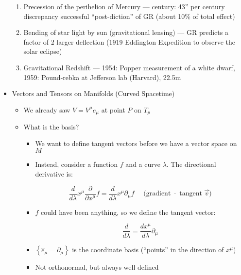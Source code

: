 \begin{itemize}
\begin{enumerate}
      \item Precession of the perihelion of Mercury —  century: 43'' per century discrepancy successful ``post-diction'' of GR (about 10\% of total effect)

      \item Bending of star light by sun (gravitational lensing) — GR predicts a factor of 2 larger deflection (1919 Eddington Expedition to observe the solar eclipse)

      \item Gravitational Redshift — 1954: Popper measurement of a white dwarf, 1959: Pound-rebka at Jefferson lab (Harvard), 22.5m

    \end{enumerate}

  \item Vectors and Tensors on Manifolds (Curved Spacetime)

    \begin{itemize}

      \item We already saw $V=V^{\mu}\hat{e}_{\mu}$ at point $P$ on $T_p$

      \item What is the basis?

        \begin{itemize}

          \item We want to define tangent vectors before we have a vector space on $M$

          \item Instead, consider a function $f$ and a curve $\lambda$. The directional derivative is:

            $$\frac{d}{d\lambda}x^{\mu}\frac{\partial}{\partial x^{\mu}}f=\frac{d}{d\lambda}x^{\mu}\partial_{\mu}f\quad\text{ (gradient $\cdot$ tangent $\vec{v}$)}$$

          \item $f$ could have been anything, so we define the tangent vector:

            $$\frac{d}{d\lambda}=\frac{dx^{\mu}}{d\lambda}\partial_{\mu}$$
            
          \item $\left\{ \hat{e}_{\mu}=\partial_{\mu} \right\}$ is the coordinate basis (``points'' in the direction of $x^{\mu}$)

          \item Not orthonormal, but always well defined


\end{itemize}
\end{itemize}
\end{itemize}
